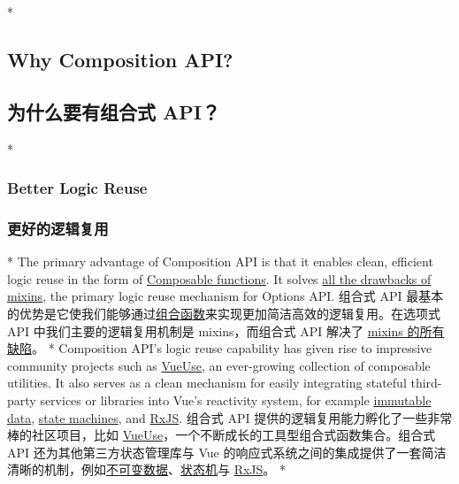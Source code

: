 \begin{paracol}{2} 
 
\switchcolumn[0]*%
\subsection{Why Composition API?}
\switchcolumn
\subsection{为什么要有组合式 API？}
\switchcolumn[0]*%
\subsubsection{Better Logic Reuse}
\switchcolumn
\subsubsection{更好的逻辑复用}
\switchcolumn[0]*%
The primary advantage of Composition API is that it enables clean,
efficient logic reuse in the form of
\href{https://vuejs.org/guide/reusability/composables.html}{Composable
functions}. It solves
\href{https://vuejs.org/guide/reusability/composables.html\#vs-mixins}{all
the drawbacks of mixins}, the primary logic reuse mechanism for Options
API.
\switchcolumn
组合式 API
最基本的优势是它使我们能够通过\href{https://cn.vuejs.org/guide/reusability/composables.html}{组合函数}来实现更加简洁高效的逻辑复用。在选项式
API 中我们主要的逻辑复用机制是 mixins，而组合式 API 解决了
\href{https://cn.vuejs.org/guide/reusability/composables.html\#vs-mixins}{mixins
的所有缺陷}。
\switchcolumn[0]*%
Composition API's logic reuse capability has given rise to impressive
community projects such as \href{https://vueuse.org/}{VueUse}, an
ever-growing collection of composable utilities. It also serves as a
clean mechanism for easily integrating stateful third-party services or
libraries into Vue's reactivity system, for example
\href{https://vuejs.org/guide/extras/reactivity-in-depth.html\#immutable-data}{immutable
data},
\href{https://vuejs.org/guide/extras/reactivity-in-depth.html\#state-machines}{state
machines}, and
\href{https://vuejs.org/guide/extras/reactivity-in-depth.html\#rxjs}{RxJS}.
\switchcolumn
组合式 API 提供的逻辑复用能力孵化了一些非常棒的社区项目，比如
\href{https://vueuse.org/}{VueUse}，一个不断成长的工具型组合式函数集合。组合式
API 还为其他第三方状态管理库与 Vue
的响应式系统之间的集成提供了一套简洁清晰的机制，例如\href{https://cn.vuejs.org/guide/extras/reactivity-in-depth.html\#immutable-data}{不可变数据}、\href{https://cn.vuejs.org/guide/extras/reactivity-in-depth.html\#state-machines}{状态机}与
\href{https://cn.vuejs.org/guide/extras/reactivity-in-depth.html\#rxjs}{RxJS}。
\switchcolumn[0]*%

\end{paracol}
